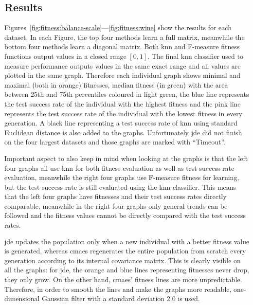 \documentclass[12pt,a4paper]{report}
\begin{document}
\subsection{Results}

Figures~\ref{fig:fitness:balance-scale}---\ref{fig:fitness:wine} show the results for each dataset. In each Figure, the top four methods learn a full matrix, meanwhile the bottom four methods learn a diagonal matrix. Both \ac{knn} and \mbox{F-measure} fitness functions output values in a closed range $[0,1]$. The final \ac{knn} classifier used to measure performance outputs values in the same exact range and all values are plotted in the same graph. Therefore each individual graph shows minimal and maximal (both in orange) fitnesses, median fitness (in green) with the area between 25th and 75th percentiles coloured in light green, the blue line represents the test success rate of the individual with the highest fitness and the pink line represents the test success rate of the individual with the lowest fitness in every generation. A black line representing a test success rate of \ac{knn} using standard Euclidean distance is also added to the graphs. Unfortunately \ac{jde} did not finish on the four largest datasets and those graphs are marked with ``Timeout''.

Important aspect to also keep in mind when looking at the graphs is that the left four graphs all use \ac{knn} for both fitness evaluation as well as test success rate evaluation, meanwhile the right four graphs use \mbox{F-measure} fitness for learning, but the test success rate is still evaluated using the \ac{knn} classifier. This means that the left four graphs have fitnesses and their test success rates directly comparable, meanwhile in the right four graphs only general trends can be followed and the fitness values cannot be directly compared with the test success rates.

\ac{jde} updates the population only when a new individual with a better fitness value is generated, whereas \ac{cmaes} regenerates the entire population from scratch every generation according to its internal covariance matrix. This is clearly visible on all the graphs: for \ac{jde}, the orange and blue lines representing fitnesses never drop, they only grow. On the other hand, \ac{cmaes}' fitness lines are more unpredictable. Therefore, in order to smooth the lines and make the graphs more readable, one-dimensional Gaussian filter with a standard deviation 2.0 is used.
\end{document}
